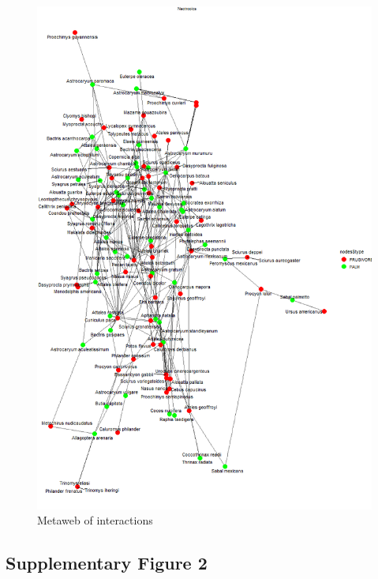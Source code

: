 \documentclass[
]{agujournal2019}
\begin{document}
\begin{figure}[H]

{\centering \includegraphics[width=5.64583in,height=\textheight,keepaspectratio]{sup_figures/S1_metaweb.png}

}

\caption{Metaweb of interactions}

\end{figure}%

\subsection{Supplementary Figure 2}
\end{document}
